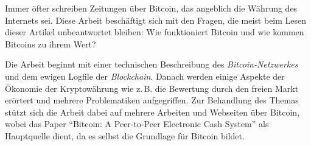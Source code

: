 Immer öfter schreiben Zeitungen über Bitcoin, das angeblich die Währung des Internets sei.
Diese Arbeit beschäftigt sich mit den Fragen, die meist beim Lesen dieser Artikel unbeantwortet bleiben:
Wie funktioniert Bitcoin und wie kommen Bitcoins zu ihrem Wert?

Die Arbeit beginnt mit einer technischen Beschreibung des \emph{Bitcoin-Netzwerkes} und dem ewigen Logfile der \emph{Blockchain}.
Danach werden einige Aspekte der Ökonomie der Kryptowährung wie z.\,B. die Bewertung durch den freien Markt erörtert und mehrere Problematiken aufgegriffen.
Zur Behandlung des Themas stützt sich die Arbeit dabei auf mehrere Arbeiten und Webseiten über Bitcoin, wobei das Paper "`Bitcoin: A Peer-to-Peer Electronic Cash System"' als Hauptquelle dient, da es selbst die Grundlage für Bitcoin bildet.
